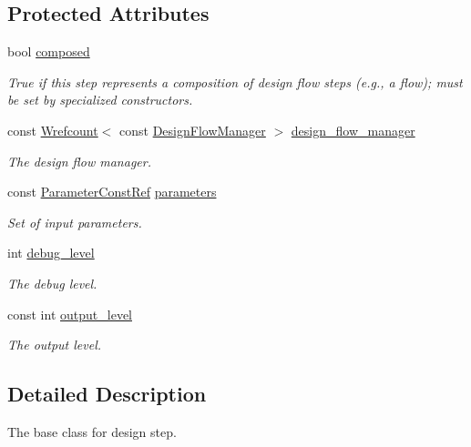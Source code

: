 \subsection*{Protected Attributes}
\begin{DoxyCompactItemize}
\item 
bool \hyperlink{classDesignFlowStep_a523e6c76331990290e451a16bcab13f3}{composed}
\begin{DoxyCompactList}\small\item\em True if this step represents a composition of design flow steps (e.\+g., a flow); must be set by specialized constructors. \end{DoxyCompactList}\item 
const \hyperlink{classWrefcount}{Wrefcount}$<$ const \hyperlink{classDesignFlowManager}{Design\+Flow\+Manager} $>$ \hyperlink{classDesignFlowStep_ab770677ddf087613add30024e16a5554}{design\+\_\+flow\+\_\+manager}
\begin{DoxyCompactList}\small\item\em The design flow manager. \end{DoxyCompactList}\item 
const \hyperlink{Parameter_8hpp_a37841774a6fcb479b597fdf8955eb4ea}{Parameter\+Const\+Ref} \hyperlink{classDesignFlowStep_a802eaafe8013df706370679d1a436949}{parameters}
\begin{DoxyCompactList}\small\item\em Set of input parameters. \end{DoxyCompactList}\item 
int \hyperlink{classDesignFlowStep_a5cc9222e58f094a5b1b78cb4426ef8b4}{debug\+\_\+level}
\begin{DoxyCompactList}\small\item\em The debug level. \end{DoxyCompactList}\item 
const int \hyperlink{classDesignFlowStep_ad1ca503adaba849037edba18d9f209b8}{output\+\_\+level}
\begin{DoxyCompactList}\small\item\em The output level. \end{DoxyCompactList}\end{DoxyCompactItemize}


\subsection{Detailed Description}
The base class for design step. 

